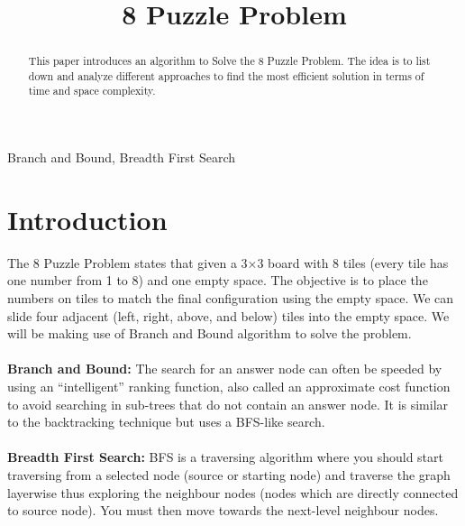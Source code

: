 \documentclass[conference]{IEEEtran}
\begin{document}
\title{8 Puzzle Problem}
\author{
\and
{}
\and
{}
}
\maketitle

\begin{abstract}
This paper introduces an algorithm to Solve the 8 Puzzle Problem. The idea is to list down and analyze different approaches to find the most efficient solution in terms of time and space complexity.
\end{abstract}

\begin{IEEEkeywords}
Branch and Bound, Breadth First Search

\end{IEEEkeywords}

\section{Introduction}

The 8 Puzzle Problem states that given a 3×3 board with 8 tiles (every tile has one number from 1 to 8) and one empty space. The objective is to place the numbers on tiles to match the final configuration using the empty space. We can slide four adjacent (left, right, above, and below) tiles into the empty space. We will be making use of Branch and Bound algorithm to solve the problem.
\\
\\
\textbf{Branch and Bound: } The search for an answer node can often be speeded by using an “intelligent” ranking function, also called an approximate cost function to avoid searching in sub-trees that do not contain an answer node. It is similar to the backtracking technique but uses a BFS-like search.\\\\
\textbf{Breadth First Search: } BFS is a traversing algorithm where you should start traversing from a selected node (source or starting node) and traverse the graph layerwise thus exploring the neighbour nodes (nodes which are directly connected to source node). You must then move towards the next-level neighbour nodes.\\
\end{document}
